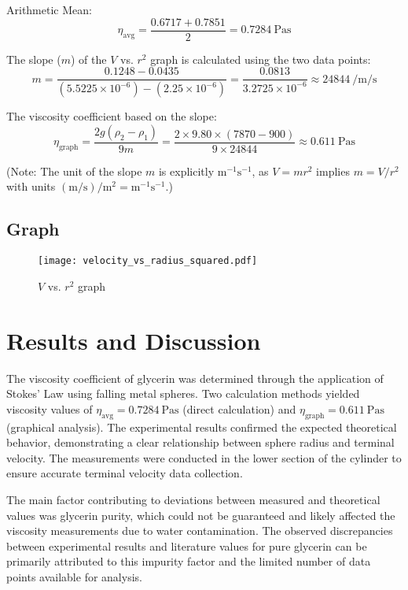 \documentclass[12pt, a4paper]{article}
\begin{document}
Arithmetic Mean:
\[ \eta_{\text{avg}} = \frac{0.6717 + 0.7851}{2} = \SI{0.7284}{\pascal\second} \]

The slope ($m$) of the $V$ vs. $r^2$ graph is calculated using the two data points:
\[ m = \frac{0.1248 - 0.0435}{(5.5225 \times 10^{-6}) - (2.25 \times 10^{-6})} = \frac{0.0813}{3.2725 \times 10^{-6}} \approx \SI{24844}{\per\metre\per\second} \]

The viscosity coefficient based on the slope:
\[ \eta_{\text{graph}} = \frac{2 g (\rho_2 - \rho_1)}{9 m} = \frac{2 \times 9.80 \times (7870 - 900)}{9 \times 24844} \approx \SI{0.611}{\pascal\second} \]

(Note: The unit of the slope $m$ is explicitly $\mathrm{m^{-1} s^{-1}}$, as $V = m r^2$ implies $m = V / r^2$ with units $(\mathrm{m/s}) / \mathrm{m^2} = \mathrm{m^{-1} s^{-1}}$.)

\subsection{Graph}
\begin{figure}[H]
	\centering
	\texttt{[image: velocity\_vs\_radius\_squared.pdf]}
	\caption{$V$ vs. $r^2$ graph}
\end{figure}

\section{Results and Discussion}
The viscosity coefficient of glycerin was determined through the application of Stokes' Law using falling metal spheres. Two calculation methods yielded viscosity values of $\eta_{\text{avg}} = \SI{0.7284}{\pascal\second}$ (direct calculation) and $\eta_{\text{graph}} = \SI{0.611}{\pascal\second}$ (graphical analysis). The experimental results confirmed the expected theoretical behavior, demonstrating a clear relationship between sphere radius and terminal velocity. The measurements were conducted in the lower section of the cylinder to ensure accurate terminal velocity data collection.

The main factor contributing to deviations between measured and theoretical values was glycerin purity, which could not be guaranteed and likely affected the viscosity measurements due to water contamination. The observed discrepancies between experimental results and literature values for pure glycerin can be primarily attributed to this impurity factor and the limited number of data points available for analysis.
\end{document}
